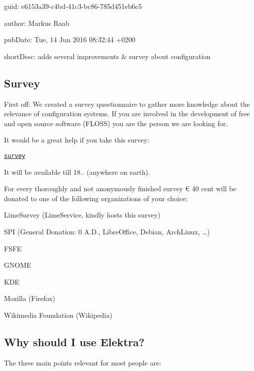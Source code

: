 
\begin{DoxyItemize}
\item guid\+: e6153a39-\/c4bd-\/41c3-\/bc86-\/785d451eb6c5
\item author\+: Markus Raab
\item pub\+Date\+: Tue, 14 Jun 2016 08\+:32\+:44 +0200
\item short\+Desc\+: adds several improvements \& survey about configuration
\end{DoxyItemize}

\subsection*{Survey}

First off\+: We created a survey questionnaire to gather more knowledge about the relevance of configuration systems. If you are involved in the development of free and open source software (F\+L\+O\+SS) you are the person we are looking for.

It would be a great help if you take this survey\+:

\href{http://elektra.limequery.org/625192}{\tt survey}

It will be available till 18.. (anywhere on earth).

For every thoroughly and not anonymously finished survey € 40 cent will be donated to one of the following organizations of your choice\+:


\begin{DoxyItemize}
\item Lime\+Survey (Lime\+Service, kindly hosts this survey)
\item S\+PI (General Donation\+: 0 A.\+D., Libre\+Office, Debian, Arch\+Linux, …)
\item F\+S\+FE
\item G\+N\+O\+ME
\item K\+DE
\item Mozilla (Firefox)
\item Wikimedia Foundation (Wikipedia)
\end{DoxyItemize}

\subsection*{Why should I use Elektra?}

The three main points relevant for most people are\+:



